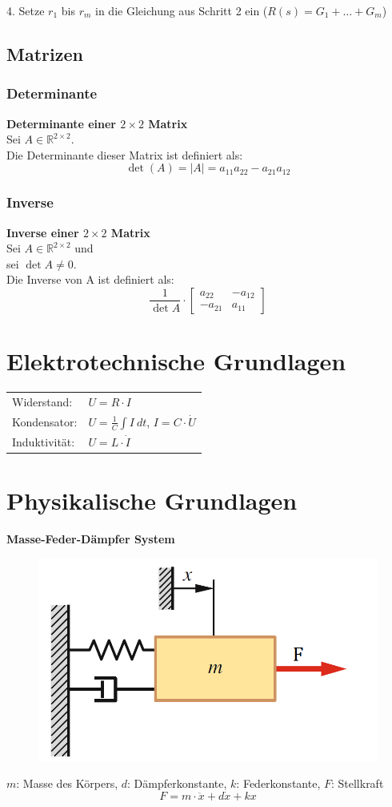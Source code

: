 \documentclass[10pt,a4paper]{article}
\renewcommand{\arraystretch}{1.5}
\newcommand{\vect}[1]{\ensuremath{\begin{bmatrix}#1\end{bmatrix}}}
\begin{document}
4. Setze $r_1$ bis $r_m$ in die Gleichung aus Schritt 2 ein ($R(s) = G_1 + \dots + G_m$) \\

\subsection{Matrizen}
\subsubsection{Determinante}
\textbf{Determinante einer $2 \times 2$ Matrix} \\
Sei $A \in \mathbb{R}^{2 \times 2}$. \\
Die Determinante dieser Matrix ist definiert als:
$$
	\det(A) = |A| = a_{11}a_{22} - a_{21}a_{12}
$$

\subsubsection{Inverse}
\textbf{Inverse einer $2 \times 2$ Matrix} \\
Sei $A \in \mathbb{R}^{2 \times 2}$ und \\
sei $\det A ≠ 0$. \\
Die Inverse von A ist definiert als:
$$
	\frac{1}{\det A} ⋅ \vect{a_{22} & -a_{12} \\ -a_{21} & a_{11}}
$$

\section{Elektrotechnische Grundlagen}
\begin{tabular}{ll}
	Widerstand: & $U = R ⋅ I$ \\
	Kondensator: & $U = \frac{1}{C} \int I ~dt$, $I = C ⋅ \dot U$ \\
	Induktivität: & $U = L ⋅ \dot I$
\end{tabular}

\renewcommand{\arraystretch}{1}
\section{Physikalische Grundlagen}
\textbf{Masse-Feder-Dämpfer System}
\begin{figure}[H]
	\includegraphics[width=0.3\columnwidth]{imgs/mass-spring-damper.png}
\end{figure}
$m$: Masse des Körpers, $d$: Dämpferkonstante, $k$: Federkonstante, $F$: Stellkraft
$$
	F = m ⋅ \ddot x + d \dot x + k x
$$
\end{document}
